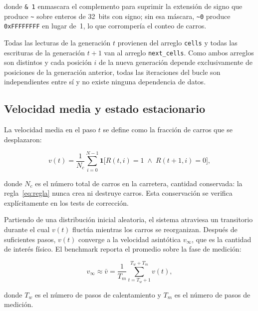 donde \texttt{\&\,1} enmascara el complemento para suprimir la extensión
de signo que produce \texttt{\textasciitilde} sobre enteros de 32~bits con
signo; sin esa máscara, \texttt{\textasciitilde 0} produce
\texttt{0xFFFFFFFF} en lugar de~1, lo que corrompería el conteo de carros.

Todas las lecturas de la generación $t$ provienen del arreglo
\texttt{cells} y todas las escrituras de la generación $t+1$ van al
arreglo \texttt{next\_cells}. Como ambos arreglos son distintos y cada
posición $i$ de la nueva generación depende exclusivamente de posiciones
de la generación anterior, todas las iteraciones del bucle son
independientes entre sí y no existe ninguna dependencia de datos.

\subsection{Velocidad media y estado estacionario}

La velocidad media en el paso $t$ se define como la fracción de carros
que se desplazaron:

\begin{equation}
    v(t) = \frac{1}{N_c}
    \sum_{i=0}^{N-1}
    \mathbf{1}\bigl[R(t,i) = 1 \;\wedge\; R(t+1,i) = 0\bigr],
    \label{eq:velocidad}
\end{equation}

donde $N_c$ es el número total de carros en la carretera, cantidad
conservada: la regla~\eqref{eq:regla} nunca crea ni destruye carros. Esta
conservación se verifica explícitamente en los tests de corrección.

Partiendo de una distribución inicial aleatoria, el sistema atraviesa un
transitorio durante el cual $v(t)$ fluctúa mientras los carros se
reorganizan. Después de suficientes pasos, $v(t)$ converge a la velocidad
asintótica $v_\infty$, que es la cantidad de interés físico. El benchmark
reporta el promedio sobre la fase de medición:

\begin{equation}
    v_\infty \approx \bar{v} =
    \frac{1}{T_m}
    \sum_{t = T_w + 1}^{T_w + T_m} v(t),
    \label{eq:vasint}
\end{equation}

donde $T_w$ es el número de pasos de calentamiento y $T_m$ es el número
de pasos de medición.

